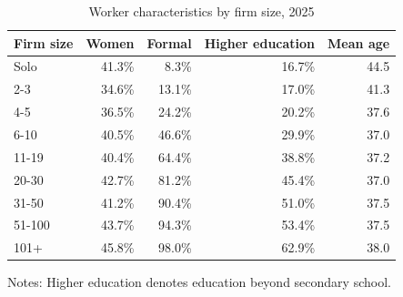 \begin{table}[htbp]
  \centering
  \caption{Worker characteristics by firm size, 2025}
  \label{tab:descriptive-worker-characteristics-2025}
  \small
  \begin{tabular}{lrrrr}
    \toprule
    Firm size & Women & Formal & Higher education & Mean age \\
    \midrule
    Solo & 41.3\% & 8.3\% & 16.7\% & 44.5 \\
    2-3 & 34.6\% & 13.1\% & 17.0\% & 41.3 \\
    4-5 & 36.5\% & 24.2\% & 20.2\% & 37.6 \\
    6-10 & 40.5\% & 46.6\% & 29.9\% & 37.0 \\
    11-19 & 40.4\% & 64.4\% & 38.8\% & 37.2 \\
    20-30 & 42.7\% & 81.2\% & 45.4\% & 37.0 \\
    31-50 & 41.2\% & 90.4\% & 51.0\% & 37.5 \\
    51-100 & 43.7\% & 94.3\% & 53.4\% & 37.5 \\
    101+ & 45.8\% & 98.0\% & 62.9\% & 38.0 \\
    \bottomrule
  \end{tabular}
  \vspace{0.3em}
  \begin{minipage}{0.95\textwidth}
  \footnotesize
  Notes: Higher education denotes education beyond secondary school.
  \end{minipage}
\end{table}
